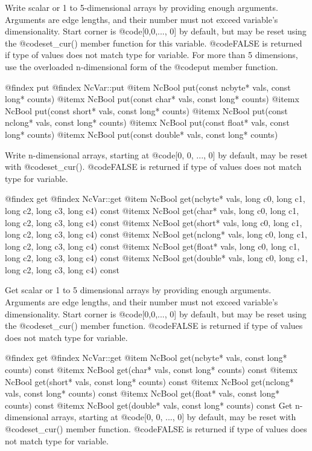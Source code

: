 Write scalar or 1 to 5-dimensional arrays by providing enough arguments.
Arguments are edge lengths, and their number must not exceed variable's
dimensionality.  Start corner is @code{[0,0,..., 0]} by default, but may
be reset using the @code{set_cur()} member function for this variable.
@code{FALSE} is returned if type of values does not match type for
variable.  For more than 5 dimensions, use the overloaded n-dimensional
form of the @code{put} member function.

@findex put
@findex NcVar::put
@item  NcBool put(const ncbyte* vals, const long* counts)
@itemx NcBool put(const char*   vals, const long* counts)
@itemx NcBool put(const short*  vals, const long* counts)
@itemx NcBool put(const nclong* vals, const long* counts)
@itemx NcBool put(const float*  vals, const long* counts)
@itemx NcBool put(const double* vals, const long* counts)

Write n-dimensional arrays, starting at @code{[0, 0, ..., 0]} by
default, may be reset with @code{set_cur()}.  @code{FALSE} is returned
if type of values does not match type for variable.

@findex get
@findex NcVar::get
@item  NcBool get(ncbyte* vals, long c0, long c1, long c2, long c3, long c4) const
@itemx NcBool get(char*   vals, long c0, long c1, long c2, long c3, long c4) const
@itemx NcBool get(short*  vals, long c0, long c1, long c2, long c3, long c4) const
@itemx NcBool get(nclong* vals, long c0, long c1, long c2, long c3, long c4) const
@itemx NcBool get(float*  vals, long c0, long c1, long c2, long c3, long c4) const
@itemx NcBool get(double* vals, long c0, long c1, long c2, long c3, long c4) const

Get scalar or 1 to 5 dimensional arrays by providing enough arguments.
Arguments are edge lengths, and their number must not exceed variable's
dimensionality.  Start corner is @code{[0,0,..., 0]} by default, but may
be reset using the @code{set_cur()} member function.  @code{FALSE} is
returned if type of values does not match type for variable.

@findex get
@findex NcVar::get
@item  NcBool get(ncbyte* vals, const long* counts) const
@itemx NcBool get(char*   vals, const long* counts) const
@itemx NcBool get(short*  vals, const long* counts) const
@itemx NcBool get(nclong* vals, const long* counts) const
@itemx NcBool get(float*  vals, const long* counts) const
@itemx NcBool get(double* vals, const long* counts) const
Get n-dimensional arrays, starting at @code{[0, 0, ..., 0]} by default,
may be reset with @code{set_cur()} member function.  @code{FALSE} is
returned if type of values does not match type for variable.

